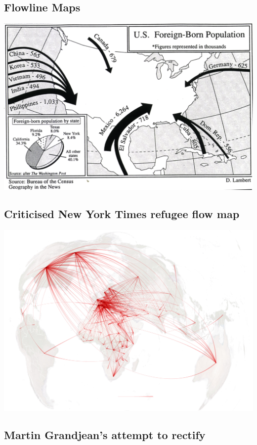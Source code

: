 \documentclass[
]{book}
\begin{document}
\hypertarget{flowline-maps}{%
\subsection{Flowline Maps}\label{flowline-maps}}

\includegraphics[width=1\linewidth]{img/lambert}

\hypertarget{criticised-new-york-times-refugee-flow-map}{%
\subsection{Criticised New York Times refugee flow map}\label{criticised-new-york-times-refugee-flow-map}}

\includegraphics[width=1\linewidth]{img/refugee_flow_map-africa}

\hypertarget{martin-grandjeans-attempt-to-rectify}{%
\subsection{Martin Grandjean's attempt to rectify}\label{martin-grandjeans-attempt-to-rectify}}
\end{document}
